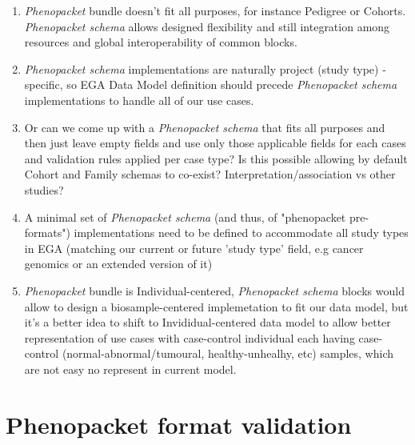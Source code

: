 \documentclass[a4paper, 10pt]{article}        %
\begin{document}
\begin{enumerate} 

\item \textit{Phenopacket} bundle doesn't fit all purposes, for instance Pedigree or Cohorts. \textit{Phenopacket schema} allows designed flexibility and still integration among resources and global interoperability of common blocks.

\item \textit{Phenopacket schema} implementations are naturally project (study type) -specific, so EGA Data Model definition should precede \textit{Phenopacket schema} implementations to handle all of our use cases. 

\item Or can we come up with a \textit{Phenopacket schema} that fits all purposes and then just leave empty fields and use only those applicable fields for each cases and validation rules applied per case type? Is this possible allowing by default Cohort and Family schemas to co-exist? Interpretation/association vs other studies?

\item A minimal set of \textit{Phenopacket schema} (and thus, of "phenopacket pre-formats") implementations need to be defined to accommodate all study types in EGA (matching our current or future 'study type' field, e.g cancer genomics or an extended version of it)


\item \textit{Phenopacket} bundle is Individual-centered, \textit{Phenopacket schema} blocks would allow to design a biosample-centered implemetation to fit our data model, but it's a better idea to shift to Invididual-centered data model to allow better representation of use cases with case-control individual each having case-control (normal-abnormal/tumoural, healthy-unhealhy, etc) samples, which are not easy no represent in current model.



\end{enumerate}

\section{Phenopacket format validation}
\end{document}
